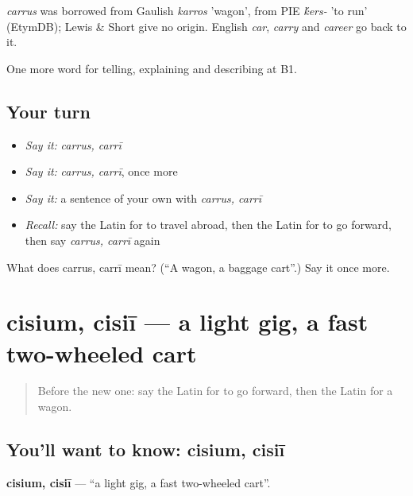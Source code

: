 \begin{cousinweb}
\emph{carrus} was borrowed from Gaulish \emph{karros} 'wagon', from PIE \emph{\'{k}ers-} 'to run' (EtymDB); Lewis \& Short give no origin. English \emph{car}, \emph{carry} and \emph{career} go back to it.
\end{cousinweb}

\begin{grammarlens}[title={What you've built}]
One more word for telling, explaining and describing at B1.
\end{grammarlens}

\subsection*{Your turn}
\begin{itemize}
\raggedright
  \item \emph{Say it:} \emph{carrus, carrī}
  \item \emph{Say it:} \emph{carrus, carrī}, once more
  \item \emph{Say it:} a sentence of your own with \emph{carrus, carrī}
  \item \emph{Recall:} say the Latin for to travel abroad, then the Latin for to go forward, then say \emph{carrus, carrī} again
\end{itemize}

\begin{tcolorbox}[breakable,colback=teal!4,colframe=teal!35!black,title={Before you move on}]
What does carrus, carrī mean? (\textquotedblleft{}A wagon, a baggage cart\textquotedblright{}.) Say it once more.
\end{tcolorbox}
\section[cisium, cisiī]{cisium, cisiī — a light gig, a fast two-wheeled cart}

\label{lesson:LA-C429-cisium}



\begin{quote}
Before the new one: say the Latin for to go forward, then the Latin for a wagon.
\end{quote}

\subsection*{You'll want to know: cisium, cisiī}
\textbf{cisium, cisiī} — \textquotedblleft{}a light gig, a fast two-wheeled cart\textquotedblright{}.

